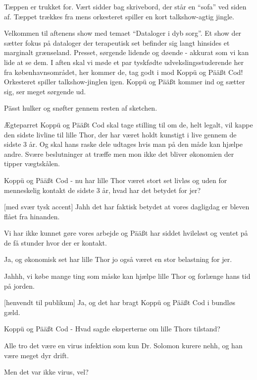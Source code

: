 \documentclass[a4paper]{article}
\begin{document}
\begin{sketch}

\scene Tæppen er trukket for. Vært sidder bag skrivebord, der står en
``sofa'' ved siden af. Tæppet trækkes fra mens orkesteret spiller en
kort talkshow-agtig jingle. 

 Velkommen til aftenens show med temaet ``Dataloger i dyb
sorg''. Et show der sætter fokus på dataloger der terapeutisk set
befinder sig langt hinsides et marginalt grænseland.
Presset, sørgende lidende og døende - akkurat som vi kan lide at se
dem.
I aften skal vi møde et par tyskfødte udvekslingsstuderende her fra
københavnsområdet, 
her kommer de, tag godt i mod Koppü og Pää\ss t Cod!
\typeout{ }
\scene Orkesteret spiller talkshow-jinglen igen. Koppü og Pää\ss t
kommer ind og sætter sig, ser meget sørgende ud.

\scene Pässt hulker og snøfter gennem resten af sketchen.

 Ægteparret Koppü og Pää\ss t Cod skal tage stilling til om de,
helt legalt, vil kappe den sidste livline til lille Thor, der har
været holdt kunstigt i live gennem de sidste 3 år. Og skal hans raske
dele udtages hvis man på den måde kan hjælpe andre. Svære beslutninger
at træffe men mon ikke det bliver økonomien der tipper vægtskålen.

 Koppü og Pää\ss t Cod - nu har lille Thor været stort set
livløs og uden for menneskelig kontakt de sidste 3 år, hvad har det
betydet for jer?


[med svær tysk accent] Jahh det har faktisk betydet at vores
dagligdag er bleven flået fra hinanden.

 Vi har ikke kunnet gøre vores arbejde og Pää\ss t har siddet
hvileløst og ventet på de få stunder hvor der er kontakt.

 Ja, og økonomisk set har lille Thor jo også været en stor
belastning for jer.


 Jahhh, vi købe mange ting som måske kan hjælpe lille Thor og
forlænge hans tid på jorden.

[henvendt til publikum] Ja, og det har bragt Koppü og Pää\ss t
Cod i bundløs gæld.

 Koppü og Pää\ss t Cod - Hvad sagde eksperterne om lille Thors
tilstand?

 Alle tro det være en virus infektion som kun Dr. Solomon
kurere nehh, og han være meget dyr drift.

 Men det var ikke virus, vel?


\end{sketch}
\end{document}
